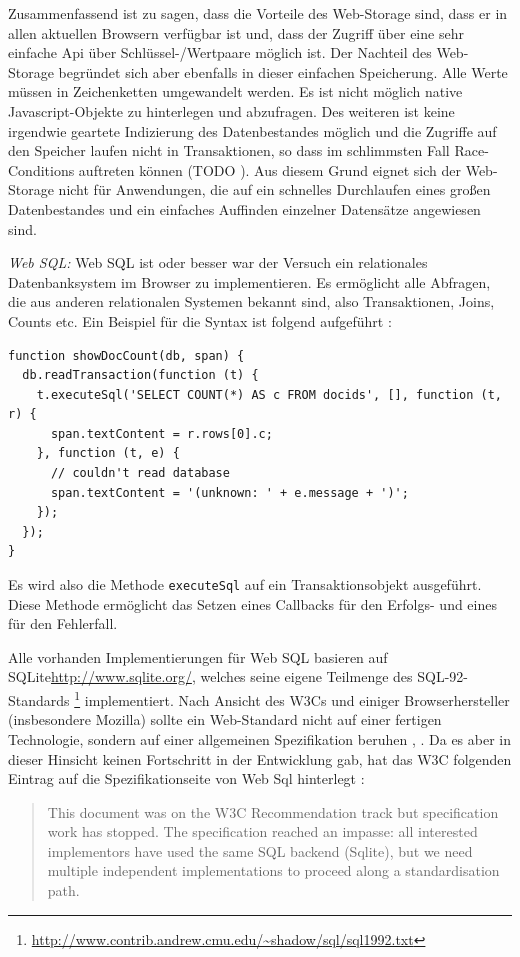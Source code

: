 Zusammenfassend ist zu sagen, dass die Vorteile des Web-Storage sind, dass er in allen aktuellen Browsern verfügbar ist und, dass der Zugriff über eine sehr einfache Api über Schlüssel-/Wertpaare möglich ist. Der Nachteil des Web-Storage begründet sich aber ebenfalls in dieser einfachen Speicherung. Alle Werte müssen in Zeichenketten umgewandelt werden. Es ist nicht möglich native Javascript-Objekte zu hinterlegen und abzufragen. Des weiteren ist keine irgendwie geartete Indizierung des Datenbestandes möglich und die Zugriffe auf den Speicher laufen nicht in Transaktionen, so dass im schlimmsten Fall Race-Conditions auftreten können (TODO \cite{}). Aus diesem Grund eignet sich der Web-Storage nicht für Anwendungen, die auf ein schnelles Durchlaufen eines großen Datenbestandes und ein einfaches Auffinden einzelner Datensätze angewiesen sind.

\emph{Web SQL:}
Web SQL ist oder besser war der Versuch ein relationales Datenbanksystem im Browser zu implementieren. Es ermöglicht alle Abfragen, die aus anderen relationalen Systemen bekannt sind, also Transaktionen, Joins, Counts etc. Ein Beispiel für die Syntax ist folgend aufgeführt \cite{web_sql_w3c}:

\begin{lstlisting}
function showDocCount(db, span) {
  db.readTransaction(function (t) {
    t.executeSql('SELECT COUNT(*) AS c FROM docids', [], function (t, r) {
      span.textContent = r.rows[0].c;
    }, function (t, e) {
      // couldn't read database
      span.textContent = '(unknown: ' + e.message + ')';
    });
  });
}
\end{lstlisting}
Es wird also die Methode \texttt{executeSql} auf ein Transaktionsobjekt ausgeführt. Diese Methode ermöglicht das Setzen eines Callbacks für den Erfolgs- und eines für den Fehlerfall. 

Alle vorhanden Implementierungen für Web SQL basieren auf SQLite{\url{http://www.sqlite.org/}}, welches seine eigene Teilmenge des SQL-92-Standards \footnote{\url{http://www.contrib.andrew.cmu.edu/~shadow/sql/sql1992.txt}} implementiert. Nach Ansicht des W3Cs und einiger Browserhersteller (insbesondere Mozilla) sollte ein Web-Standard nicht auf einer fertigen Technologie, sondern auf einer allgemeinen Spezifikation beruhen \cite{web_sql_w3c}, \cite{road_to_indexed_db_mozilla}. Da es aber in dieser Hinsicht keinen Fortschritt in der Entwicklung gab, hat das W3C folgenden Eintrag auf die Spezifikationseite von Web Sql hinterlegt :
\begin{quotation}
 This document was on the W3C Recommendation track but specification work has stopped. The specification reached an impasse: all interested implementors have used the same SQL backend (Sqlite), but we need multiple independent implementations to proceed along a standardisation path.
\end{quotation} \cite{web_sql_w3c}

